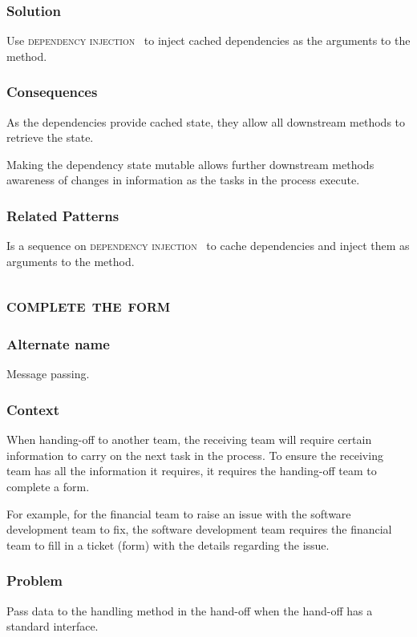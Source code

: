\documentclass[prodmode]{style/acmlarge}
\begin{document}
\subsubsection*{Solution} Use \textsc{dependency injection}~\cite{ioc} to inject
cached dependencies as the arguments to the method.

\subsubsection*{Consequences} As the dependencies provide cached state, they
allow all downstream methods to retrieve the state.

Making the dependency state mutable allows further downstream methods awareness
of changes in information as the tasks in the process execute.

\subsubsection*{Related Patterns} Is a sequence on \textsc{dependency
injection}~\cite{ioc} to cache dependencies and inject them as arguments to the
method.



\subsection{\textsc{\textbf{complete the form}}}

\subsubsection*{Alternate name} Message passing.

\subsubsection*{Context} When handing-off to another team, the receiving team
will require certain information to carry on the next task in the process.  To
ensure the receiving team has all the information it requires, it requires the
handing-off team to complete a form.

For example, for the financial team to raise an issue with the software
development team to fix, the software development team requires the financial
team to fill in a ticket (form) with the details regarding the issue.

\subsubsection*{Problem} Pass data to the handling method in the hand-off when
the hand-off has a standard interface.
\end{document}
